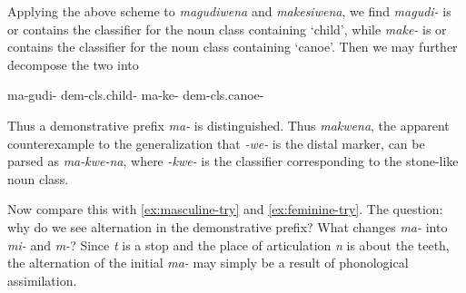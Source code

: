 \documentclass{article}
\newcommand*{\corpus}[1]{\emph{#1}}
\newcommand{\translate}[1]{`#1'}
\def\\{}%
\begin{document}
Applying the above scheme to \corpus{magudiwena} and \corpus{makesiwena},
we find \corpus{magudi-} is or contains the classifier for the noun class containing \translate{child},
while \corpus{make-} is or contains the classifier for the noun class containing \translate{canoe}.
Then we may further decompose the two into 
\begin{exe}
    \ex \begin{xlist}
        \ex \gll ma-gudi- \\
        \acs{dem}-\acs{cls}.child- \\
        \ex \gll ma-ke- \\
        \acs{dem}-\acs{cls}.canoe- \\
    \end{xlist}
\end{exe}
Thus a demonstrative prefix \corpus{ma-} is distinguished.
Thus \corpus{makwena}, 
the apparent counterexample to the generalization that \corpus{-we-} is the distal marker,
can be parsed as \corpus{ma-kwe-na},
where \corpus{-kwe-} is the classifier corresponding to the stone-like noun class.

Now compare this with \eqref{ex:masculine-try} and \eqref{ex:feminine-try}.
The question: why do we see alternation in the demonstrative prefix?
What changes \corpus{ma-} into \corpus{mi-} and \corpus{m-}?
Since \corpus{t} is a stop and the place of articulation \corpus{n} is about the teeth,
the alternation of the initial \corpus{ma-} may simply be a result of phonological assimilation.
\end{document}
